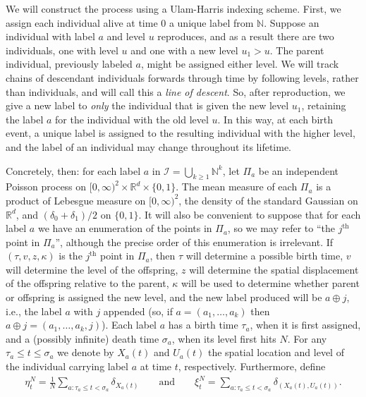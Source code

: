 \documentclass[EJP]{ejpecp} %
\newcommand{\IR}{\mathbb R}
\newcommand{\IN}{\mathbb N}
\newcommand{\lp}{\xi}              %
\newcommand{\labelspace}{\mathcal{I}} %
\newcommand{\concat}{\oplus}   %
\begin{document}
We will construct the process using a Ulam-Harris indexing scheme.
First, we assign each individual alive at time 0 a unique label from $\IN$.
Suppose an individual with label $a$ and level $u$ reproduces,
and as a result there are two individuals, one with level $u$ and one with a new level $u_1 > u$.
The parent individual, previously labeled $a$, might be assigned either level.
We will track chains of descendant individuals forwards through time by
following levels, rather than individuals, and will call this a \emph{line of descent}.
So, after reproduction, we give a new label to \emph{only} the individual
that is given the new level $u_1$,
retaining the label $a$ for the individual with the old level $u$.
In this way, at each birth event, a unique label is 
assigned to the resulting individual with the higher level,
and the label of an individual may change throughout its lifetime.

Concretely, then: for each label $a$ in
$\labelspace = \bigcup_{k \ge 1} \IN^k$,
let $\Pi_a$ be an independent Poisson process on 
$[0, \infty)^2 \times \IR^d \times \{0,1\}$.
The mean measure of each $\Pi_a$ is a product of Lebesgue measure on $[0, \infty)^2$,
the density of the standard Gaussian on $\IR^d$, and 
$(\delta_0 + \delta_1)/2$ on $\{0, 1\}$.
It will also be convenient
to suppose that for each label $a$ we have an enumeration of the points in $\Pi_a$,
so we may refer to ``the $j^\text{th}$ point in $\Pi_a$'',
although the precise order of this enumeration is irrelevant.
If $(\tau, v, z, \kappa)$ is the $j^\text{th}$ point in $\Pi_a$,
then $\tau$ will determine a possible birth time,
$v$ will determine the level of the offspring,
$z$ will determine the spatial displacement of the offspring relative to the parent,
$\kappa$ will be used to determine whether parent or offspring is assigned the new level,
and the new label produced will be $a \concat j$,
i.e., the label $a$ with $j$ appended
(so, if $a = (a_1, \ldots, a_k)$ then $a \concat j = (a_1, \ldots, a_k, j)$).
Each label $a$ has a birth time $\tau_a$,
when it is first assigned,
and a (possibly infinite) death time $\sigma_a$, when its level first hits $N$.
For any $\tau_a \le t \le \sigma_a$ we denote by $X_a(t)$ and $U_a(t)$ the spatial location and level
of the individual carrying label $a$ at time $t$, respectively.
Furthermore, define
\begin{align*}
    \eta^N_t = \frac{1}{N} \sum_{a : \tau_a \le t < \sigma_a} \delta_{X_a(t)}
    \qquad \text{and} \qquad
    \lp^N_t = \sum_{a : \tau_a \le t < \sigma_a} \delta_{(X_a(t), U_a(t))} .
\end{align*}
\end{document}
